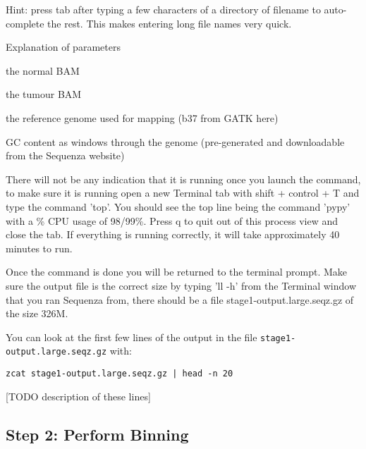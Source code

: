 Hint: press tab after typing a few characters of a directory of filename to auto-complete the rest. This makes entering long file names very quick.

\begin{note}
Explanation of parameters
\begin{description}[style=multiline,labelindent=0cm,align=right,leftmargin=\descriptionlabelspace,rightmargin=1.5cm,font=\ttfamily]
 \item[-n] the normal BAM
 \item[-t] the tumour BAM
 \item[--fasta] the reference genome used for mapping (b37 from GATK here)
 \item[-gc] GC content as windows through the genome (pre-generated and downloadable from the Sequenza website)
\end{description}
\end{note}

There will not be any indication that it is running once you launch the command, to make sure it is running open a new Terminal tab with shift + control + T and type the command 'top'. You should see the top line being the command 'pypy' with a \% CPU usage of 98/99\%. Press q to quit out of this process view and close the tab. If everything is running correctly, it will take approximately 40 minutes to run.

Once the command is done you will be returned to the terminal prompt. Make sure the output file is the correct size by typing 'll -h' from the Terminal window that you ran Sequenza from, there should be a file stage1-output.large.seqz.gz of the size 326M.

\begin{information}
You can look at the first few lines of the output in the file \texttt{stage1-output.large.seqz.gz} with:
 
\begin{lstlisting}
zcat stage1-output.large.seqz.gz | head -n 20
\end{lstlisting}
\end{information}

[TODO description of these lines]


\subsection{Step 2: Perform Binning}

